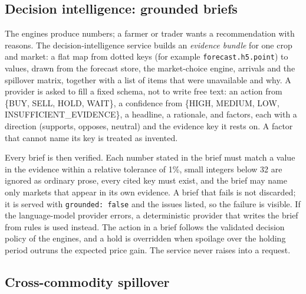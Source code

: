 \subsection{Decision intelligence: grounded briefs}
\label{sec:intel-method}

The engines produce numbers; a farmer or trader wants a recommendation with reasons. The decision-intelligence service builds an \emph{evidence bundle} for one crop and market: a flat map from dotted keys (for example \texttt{forecast.h5.point}) to values, drawn from the forecast store, the market-choice engine, arrivals and the spillover matrix, together with a list of items that were unavailable and why. A provider is asked to fill a fixed schema, not to write free text: an action from \{BUY, SELL, HOLD, WAIT\}, a confidence from \{HIGH, MEDIUM, LOW, INSUFFICIENT\_EVIDENCE\}, a headline, a rationale, and factors, each with a direction (supports, opposes, neutral) and the evidence key it rests on. A factor that cannot name its key is treated as invented.

Every brief is then verified. Each number stated in the brief must match a value in the evidence within a relative tolerance of 1\%, small integers below 32 are ignored as ordinary prose, every cited key must exist, and the brief may name only markets that appear in its own evidence. A brief that fails is not discarded; it is served with \texttt{grounded: false} and the issues listed, so the failure is visible. If the language-model provider errors, a deterministic provider that writes the brief from rules is used instead. The action in a brief follows the validated decision policy of the engines, and a hold is overridden when spoilage over the holding period outruns the expected price gain. The service never raises into a request.

\subsection{Cross-commodity spillover}
\label{sec:spill-method}

